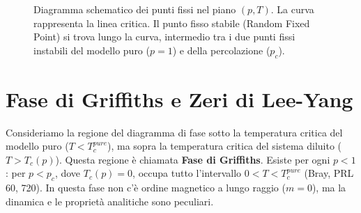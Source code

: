 \begin{figure}[h]
    \caption{Diagramma schematico dei punti fissi nel piano $(p, T)$. La curva rappresenta la linea critica. Il punto fisso stabile (Random Fixed Point) si trova lungo la curva, intermedio tra i due punti fissi instabili del modello puro ($p=1$) e della percolazione ($p_c$).}
    \label{fig:fixed_points}
\end{figure}





\newpage

\section{Fase di Griffiths e Zeri di Lee-Yang}

Consideriamo la regione del diagramma di fase sotto la temperatura critica del modello puro ($T < T_c^{pure}$), ma sopra la temperatura critica del sistema diluito ($T > T_c(p)$). Questa regione è chiamata \textbf{Fase di Griffiths}. Esiste per ogni $p<1$: per $p < p_c$, dove $T_c(p)=0$, occupa tutto l'intervallo $0 < T < T_c^{pure}$ (Bray, PRL 60, 720).
In questa fase non c'è ordine magnetico a lungo raggio ($m=0$), ma la dinamica e le proprietà analitiche sono peculiari.

